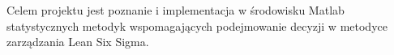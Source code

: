 Celem projektu jest poznanie i implementacja w środowisku Matlab statystycznych metodyk
wspomagających podejmowanie decyzji w metodyce zarządzania Lean Six Sigma.